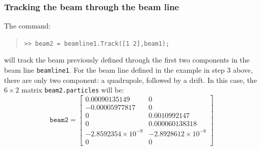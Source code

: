\documentclass[11pt,twoside,a4paper]{article}
\begin{document}
\subsubsection{Tracking the beam through the beam line}
The command:
\begin{quote}
\texttt{>> beam2 = beamline1.Track([1 2],beam1);}
\end{quote}
will track the beam previously defined through the first two components in the
beam line \texttt{beamline1}.  For the beam line defined in the example in step 3 above,
there are only two component: a quadrupole, followed by a drift.  In this case,
the $6\times 2$ matrix \texttt{beam2.particles} will be:
\[
\texttt{beam2} = \left[ \begin{array}{cc}
 0.00090135149           & 0 \\
-0.00005977817	         & 0 \\
 0	                     & 0.0010992147 \\
 0                       & 0.000060138318 \\
-2.8592354\times 10^{-9} & 	-2.8928612\times 10^{-8} \\
 0                       & 0
\end{array}
\right]
\]
\end{document}
